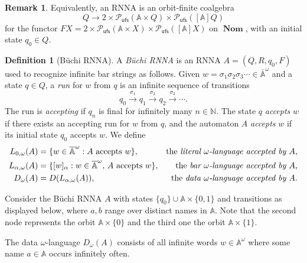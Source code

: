 \documentclass[final,a4paper,UKenglish,thm-restate,autoref,numberwithinsect]{lipics-v2021}
\newcommand{\midmid}{\hspace{0.2ex}{\rule[-0.1ex]{0.6pt}{1.65ex}}\hspace{0.2ex}}
\newcommand{\compr}{:}
\newcommand{\newletter}[1]{{\midmid}#1}
\newcommand{\barA}{\overline{\names}}
\numberwithin{equation}{section}
\newcommand{\xto}[1]{\xrightarrow{~#1~}}
\newcommand{\Nat}{{\mathbb{N}}}
\newcommand{\+}[1]{\mathcal{#1}\xspace}
\newcommand{\Pow}{\mathcal{P}}
\newcommand{\ufs}{{\mathsf{ufs}}}
\DeclareMathOperator{\Nom}{\mathbf{Nom}}
\newcommand{\names}{\mathbb{A}}
\theoremstyle{definition}
\newtheorem{defn}[theorem]{Definition}
\newtheorem{rem}[theorem]{Remark}
\begin{document}
%
\begin{rem}\label{rem:coalgebra}
  Equivalently, an RNNA is an orbit-finite coalgebra
  \[
    Q\longrightarrow 2\times \Pow_\ufs(\names\times Q)\times
    \Pow_\ufs([\names]Q)
  \]
  for the functor
  $FX = 2\times \Pow_\ufs(\names\times X)\times
  \Pow_\ufs([\names]X)$ on $\Nom$, %
  with an initial state $q_0\in Q$.
\end{rem}

\begin{defn}[Büchi RNNA]
 A \emph{Büchi RNNA} is an RNNA $A=(Q,R,q_0,F)$ used to recognize infinite bar strings as follows. Given
    $w=\sigma_1\sigma_2\sigma_3\cdots \in \barA^\omega$ and a state $q\in Q$, a \emph{run}
    for $w$ from $q$ is an infinite sequence of transitions
    \[
      q_0\xto{\sigma_1}q_1\xto{\sigma_2} q_2\xto{\sigma_3} \cdots.
    \]
    The run is \emph{accepting} if $q_n$ is final for infinitely many
    $n\in \Nat$. The state $q$ \emph{accepts} $w$ if there exists an accepting run for $w$ from $q$, and the automaton $A$ \emph{accepts} $w$ if its initial state $q_0$ accepts $w$. We define
    \begin{align*}
      L_{0,\omega}(A)
      & = \{w\in \barA^\omega\compr \text{$A$ accepts $w$}\}, &
      \text{the \emph{literal $\omega$-language accepted by $A$},}
      \\
      L_{\alpha,\omega}(A)
      & = \{ [w]_\alpha \compr w\in \barA^\omega, \, \text{$A$ accepts $w$}\},
      & \text{the \emph{bar $\omega$-language accepted by $A$},}
      \\
      D_\omega(A)
      & = D(L_{\alpha,\omega}(A)), 
      & \text{the \emph{data $\omega$-language accepted by $A$}}.
    \end{align*}
\end{defn}
%

\begin{example}\label{ex:rnna}
Consider the Büchi RNNA $A$ with states $\{q_0\} \cup \names\times \{0,1\}$ and transitions as displayed below, where $a,b$ range over distinct names in 
$\names$. Note that the second node represents the orbit $\names\times \{0\}$ and the third one the orbit $\names\times \{1\}$.
\begin{center}
\end{center}
 The data $\omega$-language $D_\omega(A)$ consists of all infinite words $w\in \names^\omega$ where some name $a\in \names$ occurs infinitely often.
\end{example}
\end{document}
